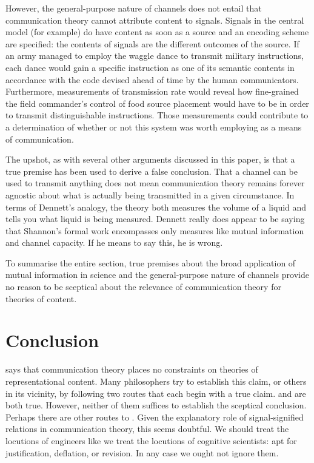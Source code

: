 \documentclass[12pt]{article}
\begin{document}
However, the general-purpose nature of channels does not entail that communication theory cannot attribute content to signals.
Signals in the central model (for example) do have content as soon as a source and an encoding scheme are specified: the contents of signals are the different outcomes of the source.
If an army managed to employ the waggle dance to transmit military instructions, each dance would gain a specific instruction as one of its semantic contents in accordance with the code devised ahead of time by the human communicators.
Furthermore, measurements of transmission rate would reveal how fine-grained the field commander's control of food source placement would have to be in order to transmit distinguishable instructions.
Those measurements could contribute to a determination of whether or not this system was worth employing as a means of communication.


The upshot, as with several other arguments discussed in this paper, is that a true premise has been used to derive a false conclusion.
That a channel can be used to transmit anything does not mean communication theory remains forever agnostic about what is actually being transmitted in a given circumstance.
In terms of Dennett's analogy, the theory both measures the volume of a liquid and tells you what liquid is being measured.
Dennett really does appear to be saying that Shannon's formal work encompasses only measures like mutual information and channel capacity.
If he means to say this, he is wrong.

To summarise the entire section, true premises about the broad application of mutual information in science and the general-purpose nature of channels provide no reason to be sceptical about the relevance of communication theory for theories of content.

\section{Conclusion}\label{sec:conclusion}

\tic{} says that communication theory places no constraints on theories of representational content.
Many philosophers try to establish this claim, or others in its vicinity, by following two routes that each begin with a true claim.
\sw{} and \ami{} are both true.
However, neither of them suffices to establish the sceptical conclusion.
Perhaps there are other routes to \tic{}.
Given the explanatory role of signal-signified relations in communication theory, this seems doubtful.
We should treat the locutions of engineers like we treat the locutions of cognitive scientists: apt for justification, deflation, or revision.
In any case we ought not ignore them.
\end{document}
